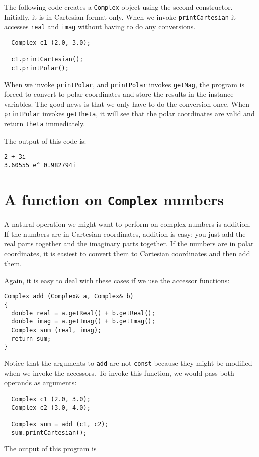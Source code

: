 The following code creates a {\tt Complex} object using the
second constructor.   Initially, it is in Cartesian format only.
When we invoke {\tt printCartesian} it accesses {\tt real} and
{\tt imag} without having to do any conversions.

\begin{lstlisting}
  Complex c1 (2.0, 3.0);

  c1.printCartesian();
  c1.printPolar();
\end{lstlisting}
%
When we invoke {\tt printPolar}, and {\tt printPolar} invokes
{\tt getMag}, the program is forced to convert to polar
coordinates and store the results in the instance variables.
The good news is that we only have to do the conversion
once.  When {\tt printPolar} invokes {\tt getTheta}, it will
see that the polar coordinates are valid and return {\tt theta}
immediately.

The output of this code is:

\begin{lstlisting}
2 + 3i
3.60555 e^ 0.982794i
\end{lstlisting}

\section{A function on {\tt Complex} numbers}

A natural operation we might want to perform on complex numbers is
addition.  If the numbers are in Cartesian coordinates, addition is
easy: you just add the real parts together and the imaginary parts
together.  If the numbers are in polar coordinates, it is easiest to
convert them to Cartesian coordinates and then add them.

Again, it is easy to deal with these cases if we use
the accessor functions:

\begin{lstlisting}
Complex add (Complex& a, Complex& b)
{
  double real = a.getReal() + b.getReal();
  double imag = a.getImag() + b.getImag();
  Complex sum (real, imag);
  return sum;
}
\end{lstlisting}
%
Notice that the arguments to {\tt add} are not {\tt const}
because they might be modified when we invoke the accessors.
To invoke this function, we would pass both operands as arguments:

\begin{lstlisting}
  Complex c1 (2.0, 3.0);
  Complex c2 (3.0, 4.0);

  Complex sum = add (c1, c2);
  sum.printCartesian();
\end{lstlisting}
%
The output of this program is

